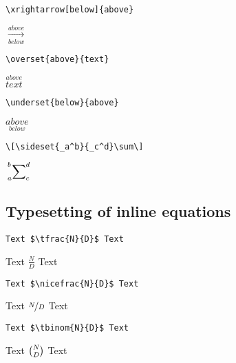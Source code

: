 \begin{center}
\begin{minipage}[l]{.4\textwidth}
\begin{verbatim}
\xrightarrow[below]{above}
\end{verbatim}
\end{minipage}
\begin{minipage}[r]{.2\textwidth}
$\xrightarrow[below]{above}$
\end{minipage}\vspace{.5cm}

\begin{minipage}[l]{.4\textwidth}
\begin{verbatim}
\overset{above}{text}
\end{verbatim}
\end{minipage}
\begin{minipage}[r]{.2\textwidth}
$\overset{above}{text}$
\end{minipage}\vspace{.5cm}

\begin{minipage}[l]{.4\textwidth}
\begin{verbatim}
\underset{below}{above}
\end{verbatim}
\end{minipage}
\begin{minipage}[l]{.2\textwidth}
$\underset{below}{above}$
\end{minipage}\vspace{.5cm}

\begin{minipage}[l]{.4\textwidth}
\begin{verbatim}
\[\sideset{_a^b}{_c^d}\sum\]
\end{verbatim}
\end{minipage}
\begin{minipage}[r]{.2\textwidth}
\qquad\quad $\displaystyle \sideset{_a^b}{_c^d}\sum$
\end{minipage}
\end{center}




\subsection{Typesetting of inline equations}
\begin{verbatim}
Text $\tfrac{N}{D}$ Text
\end{verbatim}
Text $\tfrac{N}{D}$ Text

\begin{verbatim}
Text $\nicefrac{N}{D}$ Text
\end{verbatim}
Text $\nicefrac{N}{D}$ Text

\begin{verbatim}
Text $\tbinom{N}{D}$ Text
\end{verbatim}
Text $\tbinom{N}{D}$ Text